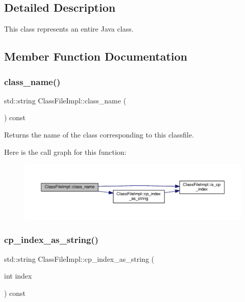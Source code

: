 \subsection{Detailed Description}
This class represents an entire Java class. 

\subsection{Member Function Documentation}
\mbox{\label{classClassFileImpl_a6b505e3750863370ca70c708d051a00c}} 
\subsubsection{\texorpdfstring{class\+\_\+name()}{class\_name()}}
{\footnotesize\ttfamily std\+::string Class\+File\+Impl\+::class\+\_\+name (\begin{DoxyParamCaption}{ }\end{DoxyParamCaption}) const}



Returns the name of the class corresponding to this classfile. 

Here is the call graph for this function\+:\nopagebreak
\begin{figure}[H]
\begin{center}
\leavevmode
\includegraphics[width=350pt]{classClassFileImpl_a6b505e3750863370ca70c708d051a00c_cgraph}
\end{center}
\end{figure}
\mbox{\label{classClassFileImpl_abf8923075c93d6d5bd1755a7b3ced362}} 
\subsubsection{\texorpdfstring{cp\+\_\+index\+\_\+as\+\_\+string()}{cp\_index\_as\_string()}}
{\footnotesize\ttfamily std\+::string Class\+File\+Impl\+::cp\+\_\+index\+\_\+as\+\_\+string (\begin{DoxyParamCaption}\item[{int}]{index }\end{DoxyParamCaption}) const}


